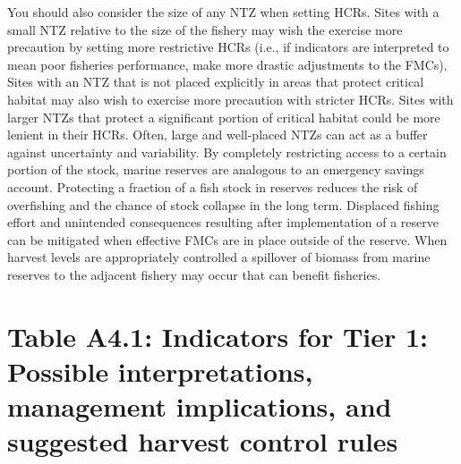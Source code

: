 \documentclass[]{book}
\begin{document}
You should also consider the size of any NTZ when setting HCRs. Sites
with a small NTZ relative to the size of the fishery may wish the
exercise more precaution by setting more restrictive HCRs (i.e., if
indicators are interpreted to mean poor fisheries performance, make more
drastic adjustments to the FMCs). Sites with an NTZ that is not placed
explicitly in areas that protect critical habitat may also wish to
exercise more precaution with stricter HCRs. Sites with larger NTZs that
protect a significant portion of critical habitat could be more lenient
in their HCRs. Often, large and well-placed NTZs can act as a buffer
against uncertainty and variability. By completely restricting access to
a certain portion of the stock, marine reserves are analogous to an
emergency savings account. Protecting a fraction of a fish stock in
reserves reduces the risk of overfishing and the chance of stock
collapse in the long term. Displaced fishing effort and unintended
consequences resulting after implementation of a reserve can be
mitigated when effective FMCs are in place outside of the reserve. When
harvest levels are appropriately controlled a spillover of biomass from
marine reserves to the adjacent fishery may occur that can benefit
fisheries.

\section{Table A4.1: Indicators for Tier 1: Possible interpretations,
management implications, and suggested harvest control
rules}\label{table-a4.1-indicators-for-tier-1-possible-interpretations-management-implications-and-suggested-harvest-control-rules}
\end{document}
